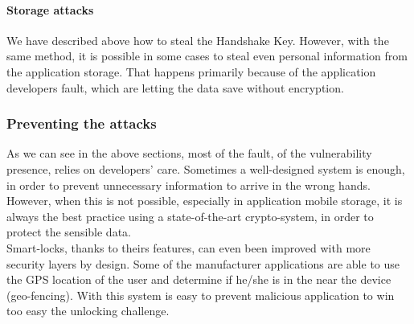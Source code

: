 \paragraph{Storage attacks}
We have described above how to steal the Handshake Key. However, with the same method, it is possible in some cases to steal even personal information from the application storage. That happens primarily because of the application developers fault, which are letting the data save without encryption.

\subsubsection{Preventing the attacks}
As we can see in the above sections, most of the fault, of the vulnerability presence, relies on developers' care. Sometimes a well-designed system is enough, in order to prevent unnecessary information to arrive in the wrong hands. However, when this is not possible, especially in application mobile storage, it is always the best practice using a state-of-the-art crypto-system, in order to protect the sensible data.
\\ Smart-locks, thanks to theirs features, can even been improved with more security layers by design. Some of the manufacturer applications are able to use the GPS location of the user and determine if he/she is in the near the device (geo-fencing). With this system is easy to prevent malicious application to win too easy the unlocking challenge.  